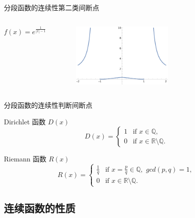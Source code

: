 \documentclass[
10pt,
aspectratio=43,
]{beamer}
\begin{document}
\begin{frame}{分段函数的连续性}{第二类间断点}
	\begin{columns}[onlytextwidth]
		\[
			f(x) = e^{\frac{1}{|x|-1}}
			\]
		\begin{figure}
			\centering
			\includegraphics[width=5cm]{Exp[1/(Abs[x]-1)}
		\end{figure}
	\end{columns}
\end{frame}

\begin{frame}{分段函数的连续性}{判断间断点}
\begin{exampleblock}{Dirichlet 函数 $D(x)$}
	\[
		D(x) = \begin{cases}
		1 & \text{if } x \in \mathbb{Q}, \\
		0 & \text{if } x \in \mathbb{R} \setminus \mathbb{Q}.
		\end{cases}
		\]

\end{exampleblock}
\pause
\begin{exampleblock}{Riemann 函数 $R(x)$}
	\[
		R(x) = \begin{cases}
			\displaystyle\frac1q & \text{if } x = \displaystyle\frac{p}{q}\in \mathbb{Q},\,\,gcd(p,q)=1, \\
		0 & \text{if } x \in \mathbb{R} \setminus \mathbb{Q}.
		\end{cases}
		\]

\end{exampleblock}

\end{frame}


	


\subsection{连续函数的性质}
\end{document}
